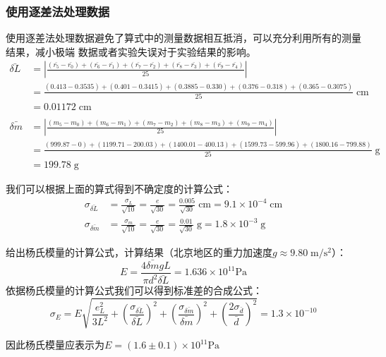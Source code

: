 \documentclass[a4paper]{ctexart}
\def\cm{\mathrm{cm}}
\def\g{\mathrm{g}}
\begin{document}
	\subsubsection{使用逐差法处理数据}
	\par 
	使用逐差法处理数据避免了算式中的测量数据相互抵消，可以充分利用所有的测量结果，减小极端
	数据或者实验失误对于实验结果的影响。
	$$
	\begin{aligned}
	\bar{\delta L} & = \left|\frac{(\bar{r_{5}}-\bar{r_{0}}) + (\bar{r_{6}}-\bar{r_{1}})
	 + (\bar{r_{7}}-\bar{r_{2}}) + (\bar{r_{8}}-\bar{r_{3}}) + (\bar{r_{9}}-\bar{r_{4}})}{25}\right|\\
	& = \frac{(0.413-0.3535) + (0.401-0.3415) + (0.3885-0.330) +
	(0.376-0.318) + (0.365-0.3075)}{25} \; \cm \\
	& = 0.01172 \; \cm\\
	\\
	\bar{\delta m} & = \left|\frac{(m_{5}-m_{0}) + (m_{6}-m_{1})
	+ (m_{7}-m_{2}) + (m_{8}-m_{3}) + (m_{9}-m_{4})}{25}\right|\\
	& = \frac{(999.87-0) + (1199.71-200.03) + (1400.01-400.13) +
	(1599.73-599.96) + (1800.16-799.88)}{25} \; \g\\
	& = 199.78 \; \g
	\end{aligned}
	$$
	\par 
	我们可以根据上面的算式得到不确定度的计算公式：
	$$
	\begin{aligned}
	\sigma_{\bar{\delta L}} &= \frac{\sigma_{L}}{\sqrt{10}} = \frac{e}{\sqrt{30}}
	= \frac{0.005}{\sqrt{30}} \; \cm = 9.1 \times 10^{-4} \; \cm\\
	\sigma_{\bar{\delta m}} &= \frac{\sigma_{m}}{\sqrt{10}} = \frac{e}{\sqrt{30}}
	= \frac{0.01}{\sqrt{30}} \; \g = 1.8 \times 10^{-3} \; \g
	\end{aligned}
	$$
	\par 
	给出杨氏模量的计算公式，计算结果（北京地区的重力加速度$g \approx 9.80 \;\mathrm{m/s^{2}}$）：
	$$
	E = \frac{4\bar{\delta m}gL}{\pi d^{2} \bar{\delta L}} = 1.636 \times 10^{11} \mathrm{Pa}
	$$
	依据杨氏模量的计算公式我们可以得到标准差的合成公式：
	$$
	\sigma_{E} = E \sqrt{\frac{e_{L}^{2}}{3L^{2}} + \left(\frac{\sigma_{\bar{\delta L}}}{\bar{\delta L}}\right)^{2} +
	\left(\frac{\sigma_{\bar{\delta m}}}{\bar{\delta m}}\right)^{2} + \left(\frac{2\sigma_{\bar{d}}}{\bar{d}}\right)^{2}}
	= 1.3 \times 10^{-10}
	$$
	\par 
	因此杨氏模量应表示为$E = (1.6 \pm 0.1) \times 10 ^{11} \mathrm{{Pa}}$
	
\end{document}

